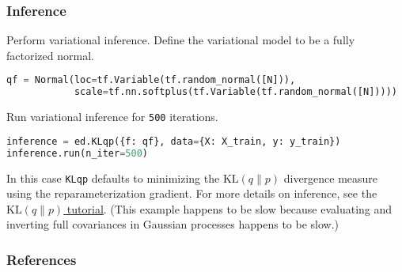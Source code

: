 \subsubsection{Inference}

Perform variational inference.
Define the variational model to be a fully factorized normal.
\begin{lstlisting}[language=Python]
qf = Normal(loc=tf.Variable(tf.random_normal([N])),
            scale=tf.nn.softplus(tf.Variable(tf.random_normal([N]))))
\end{lstlisting}

Run variational inference for \texttt{500} iterations.
\begin{lstlisting}[language=Python]
inference = ed.KLqp({f: qf}, data={X: X_train, y: y_train})
inference.run(n_iter=500)
\end{lstlisting}
In this case
\texttt{KLqp} defaults to minimizing the
$\text{KL}(q\|p)$ divergence measure using the reparameterization
gradient.
For more details on inference, see the \href{/tutorials/klqp}{$\text{KL}(q\|p)$ tutorial}.
(This example happens to be slow because evaluating and inverting full
covariances in Gaussian processes happens to be slow.)


\subsubsection{References}\label{references}
